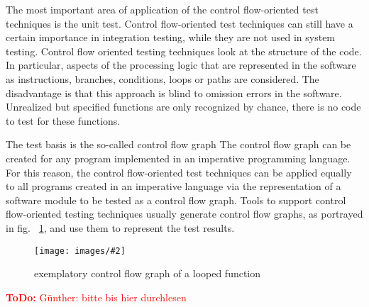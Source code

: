 \documentclass[master,english,smartquotes,apa]{hgbthesis}
\newcommand{\TODO}[1]{\textcolor{red}{\textbf{ToDo:} #1}}
\newcommand \bildGr[5]{\begin{figure}[#1]	\centering	\texttt{[image: images/\#2]}	\caption{#3}	\label{#4}	\end{figure}}
\begin{document}
	The most important area of application of the control flow-oriented test techniques is the unit test. Control flow-oriented test techniques can still have a certain importance in integration testing, while they are not used in system testing. Control flow oriented testing techniques look at the structure of the code. In particular, aspects of the processing logic that are represented in the software as instructions, branches, conditions, loops or paths are considered. The disadvantage is that this approach is blind to omission errors in the software. Unrealized but specified functions are only recognized by chance, there is no code to test for these functions.

	The test basis is the so-called control flow graph %
	The control flow graph can be created for any program implemented in an imperative programming language. For this reason, the control flow-oriented test techniques can be applied equally to all programs created in an imperative language via the representation of a software module to be tested as a control flow graph. Tools to support control flow-oriented testing techniques usually generate control flow graphs, as portrayed in fig. ~\ref{ctrlFlowExamp}, and use them to represent the test results.
	
	\bildGr{h!}{ctrlFlowExamp}{exemplatory control flow graph of a looped function }{ctrlFlowExamp}{0.5\textwidth}

	\TODO{ Günther: bitte bis hier durchlesen }
	
\end{document}
